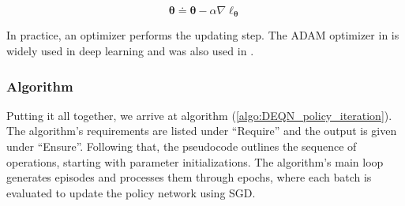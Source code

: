 \begin{equation}
    \bm{\theta} \doteq \bm{\theta} - \alpha \nabla\ell_{\bm{\theta}}
\end{equation}

In practice, an optimizer performs the updating step. The ADAM optimizer in \textcite{kingma2017adam} is widely used in deep learning and was also used in \textcite{Folini2024ClimateInCE, friedl2023_deepUQ}.

\subsubsection{Algorithm}
Putting it all together, we arrive at algorithm (\ref{algo:DEQN_policy_iteration}). The algorithm's requirements are listed under \enquote{Require} and the output is given under \enquote{Ensure}. Following that, the pseudocode outlines the sequence of operations, starting with parameter initializations. The algorithm's main loop generates episodes and processes them through epochs, where each batch is evaluated to update the policy network using SGD.



